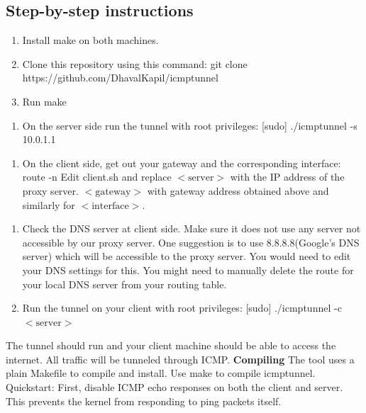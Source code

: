 \subsection*{Step-by-step instructions}
\begin{enumerate}
    \item Install make on both machines.
    \item Clone this repository using this command: git clone https://github.com/DhavalKapil/icmptunnel
    \item Run make
\end{enumerate}
\begin{enumerate}
    \item On the server side run the tunnel with root privileges: [sudo] ./icmptunnel -s 10.0.1.1
\end{enumerate}
\begin{enumerate}
    \item On the client side, get out your gateway and the corresponding interface: route -n
    Edit client.sh and replace  $<\text{server}>$ with the IP address of the proxy server. $<\text{gateway}>$ with gateway address obtained above and similarly for $<\text{interface}>$.
\end{enumerate}
\begin{enumerate}
    \item Check the DNS server at client side. 
    Make sure it does not use any server not accessible by our proxy server. 
    One suggestion is to use 8.8.8.8(Google's DNS server) which will be accessible to the proxy server. 
    You would need to edit your DNS settings for this. 
    You might need to manually delete the route for your local DNS server from your routing table.
    \item Run the tunnel on your client with root privileges: [sudo] ./icmptunnel -c $<\text{server}>$ 
\end{enumerate}
The tunnel should run and your client machine should be able to access the internet. 
All traffic will be tunneled through ICMP.
\vspace{2ex} \newline
\textbf{Compiling} 
The tool uses a plain Makefile to compile and install.
Use make to compile icmptunnel.
\vspace{1ex} \newline
Quickstart: First, disable ICMP echo responses on both the client and server. 
This prevents the kernel from responding to ping packets itself.
